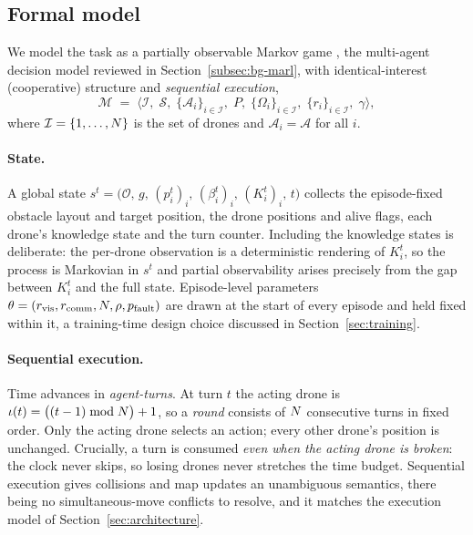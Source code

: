 \subsection{Formal model}
\label{subsec:prob-model}

We model the task as a partially observable Markov game
\citep{littman1994markov,oliehoek2016concise}, the multi-agent decision model
reviewed in Section~\ref{subsec:bg-marl}, with identical-interest (cooperative)
structure and \emph{sequential execution},
\[
\mathcal{M} \;=\; \bigl\langle \mathcal{I},\; \mathcal{S},\;
\{\mathcal{A}_i\}_{i \in \mathcal{I}},\; P,\;
\{\Omega_i\}_{i \in \mathcal{I}},\;
\{r_i\}_{i \in \mathcal{I}},\; \gamma \bigr\rangle ,
\]
where $\mathcal{I} = \{1,\dots,N\}$ is the set of drones and
$\mathcal{A}_i = \mathcal{A}$ for all $i$.

\paragraph{State.}
A global state
$s^t = \bigl(\mathcal{O},\, g,\, (p_i^t)_i,\, (\beta_i^t)_i,\,
(K_i^t)_i,\, t\bigr)$ collects the episode-fixed obstacle layout and target
position, the drone positions and alive flags, each drone's knowledge state and
the turn counter. Including the knowledge states is deliberate: the per-drone
observation is a deterministic rendering of $K_i^t$, so the process is Markovian
in $s^t$ and partial observability arises precisely from the gap between $K_i^t$
and the full state. Episode-level parameters
$\theta = (r_{\mathrm{vis}}, r_{\mathrm{comm}}, N, \rho, p_{\mathrm{fault}})$ are drawn at the start of
every episode and held fixed within it, a training-time design choice discussed
in Section~\ref{sec:training}.

\paragraph{Sequential execution.}
Time advances in \emph{agent-turns}. At turn $t$ the acting drone is
$\iota(t) = \bigl((t-1) \bmod N\bigr) + 1$, so a \emph{round} consists of
$N$ consecutive turns in fixed order. Only the acting drone selects an
action; every other drone's position is unchanged. Crucially, a turn is consumed
\emph{even when the acting drone is broken}: the clock never skips, so losing
drones never stretches the time budget. Sequential execution gives collisions and
map updates an unambiguous semantics, there being no simultaneous-move conflicts
to resolve, and it matches the execution model of
Section~\ref{sec:architecture}.

